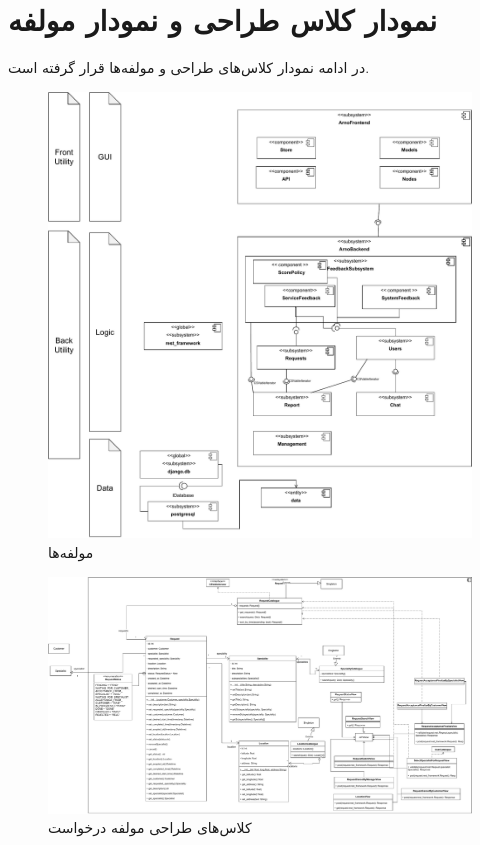 

\chapter{نمودار کلاس طراحی و  نمودار مولفه}
\label{chapter:classDesign}

در ادامه نمودار کلاس‌های طراحی و مولفه‌ها قرار گرفته است.

\eject \pdfpagewidth=12in \pdfpageheight=15in

\begin{figure}[ht!]
	\centering
	\includegraphics[scale=0.8]{figs/design-class/comps.pdf}
	\caption{مولفه‌ها}
\end{figure}
\FloatBarrier
\newpage

\eject \pdfpagewidth=21in \pdfpageheight=15in

\begin{figure}[ht!]
	\centering
	\includegraphics[scale=0.8]{figs/design-class/requests.pdf}
	\caption{کلاس‌های طراحی مولفه درخواست}
\end{figure}
\FloatBarrier
\newpage


